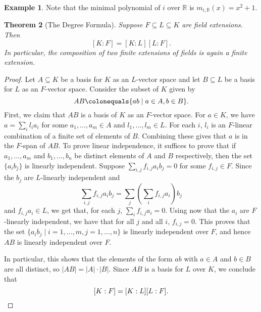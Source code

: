 \documentclass[12pt]{report}
\newtheorem{theorem}{Theorem}[chapter]
\numberwithin{equation}{section}
\numberwithin{theorem}{chapter}
\theoremstyle{definition}
\newtheorem{example}[theorem]{Example}
\newtheorem*{basic properties}{Basic Properties}
\newtheorem*{Important Remark}{Important Remark}
\begin{document}
\begin{example}
Note that the minimal polynomial of $i$ over $\mathbb{R}$ is $m_{i,\mathbb{R}}(x) = x^2 + 1$.
\end{example}



\begin{theorem}[The Degree Formula]\label{deg formula}
Suppose $F \subseteq L \subseteq K$ are field extensions. Then
$$[K:F] = [K:L] [L:F].$$
In particular, the composition of two finite extensions of fields is again a finite extension.
\end{theorem}



\begin{proof}
Let $A \subseteq K$ be a basis for $K$ as an $L$-vector space and let $B \subseteq L$ be a basis for $L$ as an $F$-vector space. Consider the subset of $K$ given by 
$$AB \colonequals \{ab \mid a \in A, b \in B\}.$$ 
First, we claim that $AB$ is a basis of $K$ as an $F$-vector space. For $a \in K$, we have $a = \sum_i l_i a_i$ for some $a_1, \dots, a_m \in A$ and $l_1, \dots, l_m \in L$. For each $i$, $l_i$ is an $F$-linear combination of a finite set of elements of $B$. Combining these gives that $a$ is in the $F$-span of $AB$. To prove linear independence, it suffices to prove that if $a_1, \dots, a_m$ and $b_1, \dots, b_n$ be distinct elements of $A$ and $B$ respectively, then the set $\{a_ib_j\}$ is linearly independent.
Suppose $\sum_{i,j} f_{i,j} a_i b_j = 0$ for some $f_{i,j} \in F$. Since the $b_j$ are $L$-linearly independent and
$$\sum_{i,j} f_{i,j} a_i b_j = \sum_j \left(\sum_i f_{i,j} a_i \right) b_j$$
and $f_{i,j} a_i \in L$, we get that, for each $j$, $\sum_i f_{i,j} a_i = 0$. Using now that the $a_i$ are $F$-linearly independent, we have that for all $j$ and all $i$, $f_{i,j} = 0$. This proves that the set $\{a_i b_j \mid i = 1, \ldots, m, j = 1, \ldots, n\}$ is linearly independent over $F$, and hence $AB$ is linearly independent over $F$.


In particular, this shows that the elements of the form $ab$ with $a \in A$ and $b \in B$ are all distinct, so $|AB| = |A| \cdot |B|$. Since $AB$ is a basis for $L$ over $K$, we conclude that
$$[K:F] = [K:L] [L:F].\qedhere$$
\end{proof}
\end{document}
